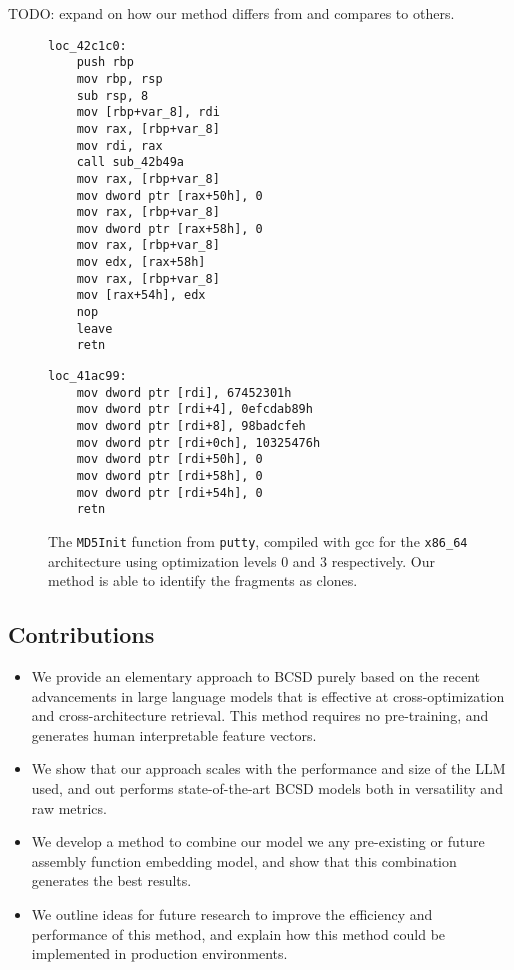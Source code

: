 \documentclass[conference,compsoc]{IEEEtran}
\begin{document}
TODO: expand on how our method differs from and compares to others.

\begin{figure*}[!t]
\centering
\begin{minipage}[t]{0.48\linewidth}
\centering
\begin{verbatim}
loc_42c1c0:
    push rbp
    mov rbp, rsp
    sub rsp, 8
    mov [rbp+var_8], rdi
    mov rax, [rbp+var_8]
    mov rdi, rax
    call sub_42b49a
    mov rax, [rbp+var_8]
    mov dword ptr [rax+50h], 0
    mov rax, [rbp+var_8]
    mov dword ptr [rax+58h], 0
    mov rax, [rbp+var_8]
    mov edx, [rax+58h]
    mov rax, [rbp+var_8]
    mov [rax+54h], edx
    nop 
    leave 
    retn 
\end{verbatim}
\end{minipage}
\hfill
\begin{minipage}[t]{0.48\linewidth}
\centering
\begin{verbatim}
loc_41ac99:
    mov dword ptr [rdi], 67452301h
    mov dword ptr [rdi+4], 0efcdab89h
    mov dword ptr [rdi+8], 98badcfeh
    mov dword ptr [rdi+0ch], 10325476h
    mov dword ptr [rdi+50h], 0
    mov dword ptr [rdi+58h], 0
    mov dword ptr [rdi+54h], 0
    retn 
\end{verbatim}
\label{asm-diff}
\end{minipage}
\caption{The \texttt{MD5Init} function from \texttt{putty}, compiled with gcc for the 
    \texttt{x86\_64} architecture using optimization levels 0 and 3 respectively.
    Our method is able to identify the fragments as clones.}
\end{figure*}

\subsection{Contributions}

\begin{itemize}
\item We provide an elementary approach to BCSD purely based on the recent advancements in large language models that
    is effective at cross-optimization and cross-architecture retrieval. This method requires no pre-training, and
    generates human interpretable feature vectors.
\item We show that our approach scales with the performance and size of the LLM used, and out performs state-of-the-art BCSD models
    both in versatility and raw metrics.
\item We develop a method to combine our model we any pre-existing or future assembly function embedding model, and show that
    this combination generates the best results.
\item We outline ideas for future research to improve the efficiency and performance of this method, and explain how this method
    could be implemented in production environments.
\end{itemize}
\end{document}
